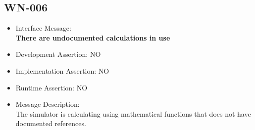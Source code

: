 \subsection{WN-006}
\begin{itemize}
  \item Interface Message:\\[1em]
    \textbf{There are undocumented calculations in use}
  \item Development Assertion: NO
  \item Implementation Assertion: NO
  \item Runtime Assertion: NO
  \item Message Description:\\[1em]
    The simulator is calculating using mathematical functions that does not have documented references.
\end{itemize}

